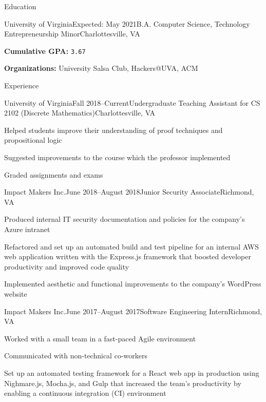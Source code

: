 \documentclass{resume}
\begin{document}
\begin{rSection}{Education}
  \begin{rSubsection}{University of Virginia}{Expected: May 2021}{B.A. Computer Science, Technology Entrepreneurship Minor}{Charlottesville, VA}
  \item \textbf{Cumulative GPA:} \texttt{3.67}
  \item \textbf{Organizations:} University Salsa Club, Hackers@UVA, ACM
  \end{rSubsection}
\end{rSection}

\begin{rSection}{Experience}

  \begin{rSubsection}{University of Virginia}{Fall 2018--Current}{Undergraduate Teaching Assistant for CS 2102 (Discrete Mathematics)}{Charlottesville, VA}
  \item Helped students improve their understanding of proof techniques and propositional logic
  \item Suggested improvements to the course which the professor implemented
  \item Graded assignments and exams
  \end{rSubsection}

  \begin{rSubsection}{Impact Makers Inc.}{June 2018--August 2018}{Junior Security Associate}{Richmond, VA}
  \item Produced internal IT security documentation and policies for the company's Azure intranet
  \item Refactored and set up an automated build and test pipeline for an internal AWS web application written with the Express.js framework that boosted developer productivity and improved code quality
  \item Implemented aesthetic and functional improvements to the company's WordPress website
  \end{rSubsection}

  \begin{rSubsection}{Impact Makers Inc.}{June 2017--August 2017}{Software Engineering Intern}{Richmond, VA}
  \item Worked with a small team in a fast-paced Agile environment
  \item Communicated with non-technical co-workers
  \item Set up an automated testing framework for a React web app in production using Nighmare.js, Mocha.js, and Gulp that increased the team's productivity by enabling a continuous integration (CI) environment
  \end{rSubsection}

\end{rSection}
\end{document}
